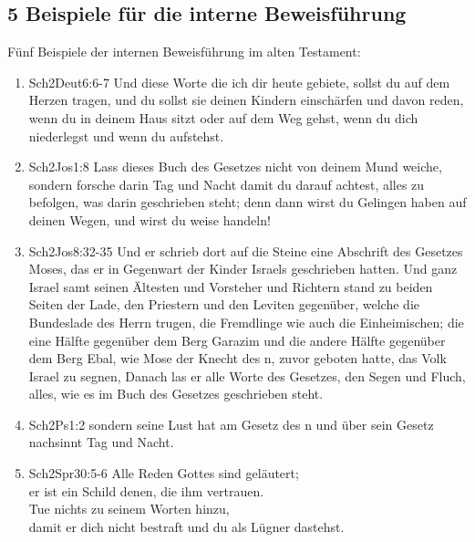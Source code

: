 \subsection{5 Beispiele für die interne Beweisführung}
Fünf Beispiele der internen Beweisführung im alten Testament:
\renewcommand{\labelenumi}{\Roman{enumi}}
\begin{enumerate}
	\item  
	\begin{bibeltext}{Sch2}{Deut}{6:6-7}
		Und diese Worte die ich dir heute gebiete, sollst du auf dem Herzen tragen, und du sollst sie deinen Kindern einschärfen und davon reden, wenn du in deinem Haus sitzt oder auf dem Weg gehst, wenn du dich niederlegst und wenn du aufstehst.
	\end{bibeltext}
	\item 
	\begin{bibeltext}{Sch2}{Jos}{1:8}
		Lass dieses Buch des Gesetzes nicht von deinem Mund weiche, sondern forsche darin Tag und Nacht damit du darauf achtest, alles zu befolgen, was darin geschrieben steht; denn dann wirst du Gelingen haben auf deinen Wegen, und wirst du weise handeln!
	\end{bibeltext}
	\item 
	\begin{bibeltext}{Sch2}{Jos}{8:32-35}
		Und er schrieb dort auf die Steine eine Abschrift des Gesetzes Moses, das er in Gegenwart der Kinder Israels geschrieben hatten. Und ganz Israel samt seinen Ältesten und Vorsteher und Richtern stand zu beiden Seiten der Lade, den Priestern und den Leviten gegenüber, welche die Bundeslade des Herrn trugen, die Fremdlinge wie auch die Einheimischen; die eine Hälfte gegenüber dem Berg Garazim und die andere Hälfte gegenüber dem Berg Ebal, wie Mose der Knecht des \herr n, zuvor geboten hatte, das Volk Israel zu segnen, Danach las er alle Worte des Gesetzes, den Segen und Fluch, alles, wie es im Buch des Gesetzes geschrieben steht.
	\end{bibeltext}
\item 
	\begin{bibeltext}{Sch2}{Ps}{1:2}
		sondern seine Lust hat am Gesetz des \herr n und über sein Gesetz nachsinnt Tag und Nacht.
	\end{bibeltext}
\item 
	\begin{bibeltext}{Sch2}{Spr}{30:5-6}
		Alle Reden Gottes sind geläutert;\\
		er ist ein Schild denen, die ihm vertrauen.\\
		Tue nichts zu seinem Worten hinzu,\\
		damit er dich nicht bestraft und du als Lügner dastehst.\\
	\end{bibeltext}
\end{enumerate}
